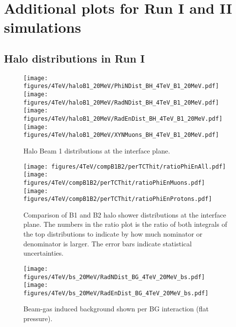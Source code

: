 \section{Additional plots for Run I and II simulations\label{run1run2app}}

\subsection{Halo distributions in Run I}

\begin{figure}%
\begin{center}
\texttt{[image: figures/4TeV/haloB1\_20MeV/PhiNDist\_BH\_4TeV\_B1\_20MeV.pdf]}
\texttt{[image: figures/4TeV/haloB1\_20MeV/RadNDist\_BH\_4TeV\_B1\_20MeV.pdf]}
\texttt{[image: figures/4TeV/haloB1\_20MeV/RadEnDist\_BH\_4TeV\_B1\_20MeV.pdf]}
\texttt{[image: figures/4TeV/haloB1\_20MeV/XYNMuons\_BH\_4TeV\_B1\_20MeV.pdf]}
\end{center}
\vspace{-0.6cm}
 \caption{Halo Beam 1 distributions at the interface plane. 
  \label{dist4TeVB1}}
\end{figure}

\begin{figure}%
\begin{center}
\texttt{[image: figures/4TeV/compB1B2/perTCThit/ratioPhiEnAll.pdf]}
\texttt{[image: figures/4TeV/compB1B2/perTCThit/ratioPhiEnMuons.pdf]}
\texttt{[image: figures/4TeV/compB1B2/perTCThit/ratioPhiEnProtons.pdf]}
\end{center}
\vspace{-0.6cm}
\caption{Comparison of B1 and B2 halo shower distributions at the interface plane. The numbers in the ratio plot is the ratio of both integrals of the top distributions to indicate by how much nominator or denominator is larger. The error bars indicate statistical uncertainties.
  \label{comp4TeVB1B2}}
\end{figure}


\begin{figure}%
\begin{center}
\texttt{[image: figures/4TeV/bs\_20MeV/RadNDist\_BG\_4TeV\_20MeV\_bs.pdf]}
\texttt{[image: figures/4TeV/bs\_20MeV/RadEnDist\_BG\_4TeV\_20MeV\_bs.pdf]}
\end{center}
\vspace{-0.6cm}
 \caption{Beam-gas induced background shown per BG interaction (flat pressure).
  \label{dist4TeVBGbs}}
\end{figure}




